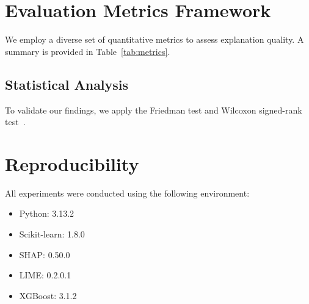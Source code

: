 \section{Evaluation Metrics Framework}
We employ a diverse set of quantitative metrics to assess explanation quality. A summary is provided in Table~\ref{tab:metrics}.



\subsection{Statistical Analysis}
To validate our findings, we apply the Friedman test and Wilcoxon signed-rank test~\cite{demsar2006statistical}.

\section{Reproducibility}
All experiments were conducted using the following environment:
\begin{itemize}
    \item Python: 3.13.2
    \item Scikit-learn: 1.8.0
    \item SHAP: 0.50.0
    \item LIME: 0.2.0.1
    \item XGBoost: 3.1.2
\end{itemize}

